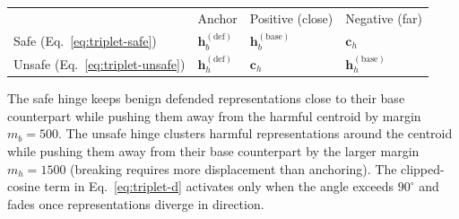 \smallskip
\noindent
\begin{tabular}{@{}l l l l@{}}
                                       & Anchor                          & Positive (close)                  & Negative (far)                    \\
  Safe (Eq.~\ref{eq:triplet-safe})     & \(\mathbf{h}^{(\text{def})}_b\) & \(\mathbf{h}^{(\text{base})}_b\)  & \(\mathbf{c}_h\)                  \\
  Unsafe (Eq.~\ref{eq:triplet-unsafe}) & \(\mathbf{h}^{(\text{def})}_h\) & \(\mathbf{c}_h\)                  & \(\mathbf{h}^{(\text{base})}_h\)  \\
\end{tabular}

\smallskip
\noindent
The safe hinge keeps benign defended representations close to their
base counterpart while pushing them away from the harmful centroid
by margin \(m_b\!=\!500\).  The unsafe hinge clusters harmful
representations around the centroid while pushing them away from
their base counterpart by the larger margin \(m_h\!=\!1500\) (breaking
requires more displacement than anchoring).  The clipped-cosine term
in Eq.~\ref{eq:triplet-d} activates only when the angle exceeds
\(90^\circ\) and fades once representations diverge in direction.

%
